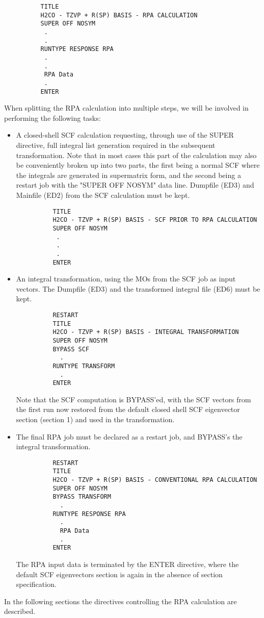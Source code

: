 \documentclass[11pt,fleqn]{article}
\begin{document}
{
\footnotesize
\begin{verbatim}
          TITLE
          H2CO - TZVP + R(SP) BASIS - RPA CALCULATION
          SUPER OFF NOSYM
           .
           .
          RUNTYPE RESPONSE RPA
           .
           .
           RPA Data
           .
          ENTER
\end{verbatim}
}
When splitting the RPA calculation into multiple steps, we will be 
involved in performing the following tasks:
\begin{itemize}
\item A closed-shell SCF calculation requesting, through use
of the SUPER directive,  full integral list generation required 
in the subsequent transformation.  Note that in most cases this 
part of the calculation may also be conveniently broken up 
into two parts, the first being a normal SCF where the integrals are 
generated in supermatrix form, and the second being a restart job 
with the "SUPER OFF NOSYM" data line.  Dumpfile (ED3) and 
Mainfile (ED2) from the SCF calculation must be kept.

{
\footnotesize
\begin{verbatim}
          TITLE
          H2CO - TZVP + R(SP) BASIS - SCF PRIOR TO RPA CALCULATION
          SUPER OFF NOSYM
           .
           .
           .
          ENTER
\end{verbatim}
}

\item An integral transformation, using the MOs from the
SCF job as input vectors. The Dumpfile (ED3) and the transformed
integral file (ED6) must be kept.

{
\footnotesize
\begin{verbatim}
          RESTART
          TITLE
          H2CO - TZVP + R(SP) BASIS - INTEGRAL TRANSFORMATION
          SUPER OFF NOSYM
          BYPASS SCF
            .
          RUNTYPE TRANSFORM
            .
          ENTER
\end{verbatim}
}
Note that the SCF computation is BYPASS'ed, with the SCF vectors 
from the first run now restored from the default closed shell
SCF eigenvector section (section 1) and used in the transformation.

\item The final RPA job must be declared as a restart job, and
BYPASS's the integral transformation.

{
\footnotesize
\begin{verbatim}
          RESTART
          TITLE
          H2CO - TZVP + R(SP) BASIS - CONVENTIONAL RPA CALCULATION
          SUPER OFF NOSYM
          BYPASS TRANSFORM
            .
          RUNTYPE RESPONSE RPA
            .
            RPA Data
            .
          ENTER
\end{verbatim}
}
The RPA input data is terminated by the ENTER directive, where the
default SCF eigenvectors section is again in the absence of
section specification.

\end{itemize}
In the following sections the directives controlling the RPA 
calculation are described. 
\end{document}
